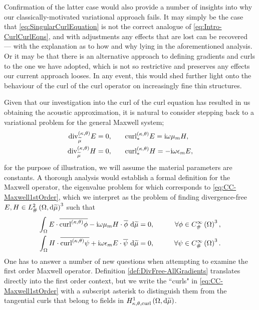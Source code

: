 Confirmation of the latter case would also provide a number of insights into why our classically-motivated variational approach fails.
It may simply be the case that \eqref{eq:SingularCurlEquation} is not the correct analogue of \eqref{eq:Intro-CurlCurlEqns}, and with adjustments any effects that are lost can be recovered --- with the explanation as to how and why lying in the aforementioned analysis.
Or it may be that there is an alternative approach to defining gradients and curls to the one we have adopted, which is not so restrictive and preserves any effects our current approach looses.
In any event, this would shed further light onto the behaviour of the curl of the curl operator on increasingly fine thin structures.

Given that our investigation into the curl of the curl equation has resulted in us obtaining the acoustic approximation, it is natural to consider stepping back to a variational problem for the general Maxwell system;
\begin{subequations} \label{eq:CC-Maxwell1stOrder}
	\begin{align}
		\mathrm{div}_{\widetilde{\mu}}^{\left( \kappa, \theta \right)} E = 0,
		&\qquad
		\mathrm{curl}_{*}^{\left( \kappa, \theta \right)}E = \mathrm{i}\omega\mu_m H, \\
		\mathrm{div}_{\widetilde{\mu}}^{\left( \kappa, \theta \right)} H = 0,
		&\qquad
		\mathrm{curl}_{*}^{\left( \kappa, \theta \right)}H = -\mathrm{i}\omega\epsilon_m E,
	\end{align}
\end{subequations}
for the purpose of illustration, we will assume the material parameters are constants. 
A thorough analysis would establish a formal definition for the Maxwell operator, the eigenvalue problem for which corresponds to \eqref{eq:CC-Maxwell1stOrder}, which we interpret as the problem of finding divergence-free $E,H\in L^2_{\#}\left( \Omega,\mathrm{d} \widetilde{\mu} \right)^3$ such that
\begin{subequations} \label{eq:CC-Maxwell1stOrderVariational}
	\begin{align} 
		\int_{\Omega} E\cdot\overline{\mathrm{curl}_{}^{\left( \kappa, \theta \right)}\phi} - \mathrm{i}\omega\mu_m H\cdot\overline{\phi}  \ \mathrm{d}\widetilde{\mu} &= 0, 
		\qquad &\forall \phi\in C^{\infty}_{\#}\left( \Omega \right)^3, \\
		\int_{\Omega} H\cdot\overline{\mathrm{curl}_{}^{\left( \kappa, \theta \right)}\psi} + \mathrm{i}\omega\epsilon_m E\cdot\overline{\psi}  \ \mathrm{d}\widetilde{\mu} &= 0,
		\qquad &\forall \psi\in C^{\infty}_{\#}\left( \Omega \right)^3.
	\end{align}
\end{subequations}
One has to answer a number of new questions when attempting to examine the first order Maxwell operator.
Definition \ref{def:DivFree-AllGradients} translates directly into the first order context, but we write the ``curls" in \eqref{eq:CC-Maxwell1stOrder} with a subscript asterisk to distinguish them from the tangential curls that belong to fields in $H^1_{\kappa,\theta,\mathrm{curl}}\left( \Omega, \mathrm{d}\widetilde{\mu} \right)$.
